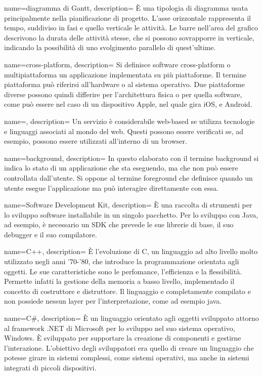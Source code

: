 {
  name=diagramma di Gantt,
  description={ È una tipologia di diagramma usata principalmente nella pianificazione di progetto. L'asse orizzontale rappresenta il tempo, suddiviso in fasi e quello
  verticale le attività. Le barre nell'area del grafico descrivono la durata delle attività stesse, che si possono sovrapporre in verticale,
  indicando la possibilità di uno svolgimento parallelo di quest'ultime.}
}

{
  name=cross-platform,
  description={ Si definisce software cross-platform o multipiattaforma un applicazione implementata su più piattaforme. Il termine
  piattaforma può riferirsi all'hardware o al sistema operativo. Due piattaforme diverse possono quindi differire per l'architettura fisica
  o per quella software, come può essere nel caso di un dispositivo Apple, nel quale gira \gls{iOS}, e \gls{Android}. }
}

{
  name=,
  description={ Un servizio è considerabile web-based se utilizza tecnologie e linguaggi associati al mondo del web. Questi possono essere
  verificati se, ad esempio, possono essere utilizzati all'interno di un browser.}
}

{
  name=background,
  description={ In questo elaborato con il termine background si indica lo stato di un applicazione che sta eseguendo, ma che non
  può essere controllata dall'utente. Si oppone al termine foreground che definisce quando un utente esegue l'applicazione ma può
  interagire direttamente con essa.  }
}

{
  name=Software Development Kit,
  description={ È una raccolta di strumenti per lo sviluppo software installabile in un singolo pacchetto. Per lo sviluppo con Java, ad
  esempio, è necessario un SDK che prevede le sue librerie di base, il suo debugger e il suo compilatore. }
}


{
  name=C++,
  description={ È l'evoluzione di C, un linguaggio ad alto livello molto utilizzato negli anni '70-'80, che introduce la programmazione
  orientata agli oggetti. Le sue caratteristiche sono le perfomance, l'efficienza e la flessibilità. Permette infatti la gestione della
  memoria a basso livello, implementado il concetto di costruttore e distruttore. Il linguaggio e completamente compilato e non possiede
  nessun layer per l'interpretazione, come ad esempio \gls{java}.}
}

{
  name=C\#,
  description={ È un linguaggio orientato agli oggetti sviluppato attorno al framework .NET di Microsoft per lo sviluppo nel suo sistema
  operativo, Windows. È sviluppato per supportare la creazione di componenti e gestirne l'interazione. L'obiettivo degli sviluppatori era
  quello di creare un linguaggio che potesse girare in sistemi complessi, come sistemi operativi, ma anche in sistemi integrati di piccoli dispositivi.}
}

